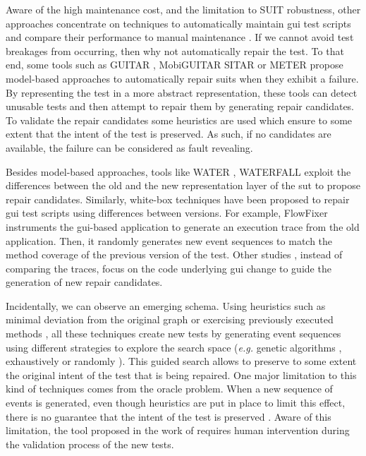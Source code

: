 Aware of the high maintenance cost, and the limitation to SUIT robustness, other approaches concentrate on techniques to automatically maintain \gls{gui} test scripts and compare their performance to manual maintenance \cite{Grechanik2009, Grechanik2009b}. If we cannot avoid test breakages from occurring, then why not automatically repair the test. To that end, some tools such as GUITAR \cite{Memon2008}, MobiGUITAR \cite{Amalfitano2015} SITAR \cite{Gao2016} or METER \cite{Pan2020} propose model-based approaches to automatically repair \gls{suit}s when they exhibit a failure. By representing the test in a more abstract representation, these tools can detect unusable tests and then attempt to repair them by generating repair candidates. To validate the repair candidates some heuristics are used which ensure to some extent that the intent of the test is preserved. As such, if no candidates are available, the failure can be considered as fault revealing.

Besides model-based approaches, tools like WATER \cite{Choudhary2011}, WATERFALL \cite{Hammoudi2016b} exploit the differences between the old and the new representation layer of the \gls{sut} to propose repair candidates. Similarly, white-box techniques have been proposed to repair \gls{gui} test scripts using differences between versions. For example, FlowFixer \cite{Zhang2013} instruments the \gls{gui}-based application to generate an execution trace from the old application. Then, it randomly generates new event sequences to match the method coverage of the previous version of the test. Other studies \cite{Grechanik2009, Fu2009}, instead of comparing the traces, focus on the code underlying \gls{gui} change to guide the generation of new repair candidates.

Incidentally, we can observe an emerging schema. Using heuristics such as minimal deviation from the original graph\cite{Memon2008} or exercising previously executed methods \cite{Zhang2013}, all these techniques create new tests by generating event sequences using different strategies  to explore the search space (\emph{e.g.} genetic algorithms \cite{Huang2010}, exhaustively \cite{Memon2008} or randomly \cite{Zhang2013}). This guided search allows to preserve to some extent the original intent of the test that is being repaired. One major limitation to this kind of techniques comes from the oracle problem. When a new sequence of events is generated, even though heuristics are put in place to limit this effect, there is no guarantee that the intent of the test is preserved \cite{Li2019}. Aware of this limitation, the tool proposed in the work of \textcite{Gao2016} requires human intervention during the validation process of the new tests.

